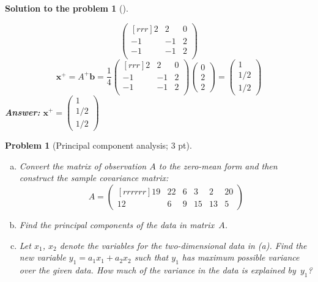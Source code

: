 \documentclass[12pt,a4]{article}
\newtheorem{problem}{Problem}
\newtheorem{solution}{Solution to the problem}
\newcommand{\bb}{{\mathbf b}}
\newcommand{\bx}{{\mathbf x}}
\newcommand{\answer}[1]{\textbf{Answer:} #1}
\begin{document}
\begin{solution}[]
\begin{enumerate}[(a)]
\[\begin{pmatrix}[rrr]
2 & 2 & 0 \\
-1 & -1 & 2 \\
-1 & -1 & 2 \\
\end{pmatrix}
\]
\[
\bx^+ = A^+\bb =  \frac14
\begin{pmatrix}[rrr] 
2 & 2 & 0 \\
-1 & -1 & 2 \\
-1 & -1 & 2 \\
\end{pmatrix}
\begin{pmatrix}
0 \\ 2 \\ 2
\end{pmatrix}
=
\begin{pmatrix}
1 \\ 1/2 \\ 1/2
\end{pmatrix}
\]
\answer{$
\bx^+ =
\begin{pmatrix}
1 \\ 1/2 \\ 1/2
\end{pmatrix}
$}\\[5pt]
\end{enumerate}
\end{solution}


\begin{problem}[Principal component analysis; 3 pt]\label{prb:13.7}\rm
\begin{enumerate}[(a)]
  \item Convert the matrix of observation $A$ to the zero-mean form and then construct the sample covariance matrix:
  \[
    A = \begin{pmatrix}[rrrrrr]
      19 & 22 & 6 & 3 & 2 & 20\\ 12 & 6 & 9 & 15 & 13 & 5
    \end{pmatrix}
  \]  
  \item Find the principal components of the data in matrix~$A$.
  \item Let $x_1$, $x_2$ denote the variables for the two-dimensional data in (a). Find the new variable $y_1 = a_1x_1 + a_2 x_2$ such that $y_1$ has maximum possible variance over the given data. How much of the variance in the data is explained by~$y_1$?
\end{enumerate}
\end{problem}
\end{document}
